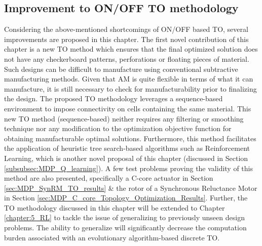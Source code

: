 \subsection{Improvement to ON/OFF TO methodology}

Considering the above-mentioned shortcomings of ON/OFF based TO, several improvements are proposed in this chapter. The first novel contribution of this chapter is a new TO method which ensures that the final optimized solution does not have any checkerboard patterns, perforations or floating pieces of material. Such designs can be difficult to manufacture using conventional subtractive manufacturing methods. Given that AM is quite flexible in terms of what it can manufacture, it is still necessary to check for manufacturability prior to finalizing the design. The proposed TO methodology leverages a sequence-based environment to impose connectivity on cells containing the same material. This new TO method (sequence-based) neither requires any filtering or smoothing technique nor any modification to the optimization objective function for obtaining manufacturable optimal solutions. Furthermore, this method facilitates the application of heuristic tree search-based algorithms such as Reinforcement Learning, which is another novel proposal of this chapter (discussed in Section \ref{subsubsec:MDP_Q_learning}). A few test problems proving the validity of this method are also presented, specifically a C-core actuator in Section \ref{sec:MDP_SynRM_TO_results} \& the rotor of a Synchronous Reluctance Motor in Section \ref{sec:MDP_C_core_Topology_Optimization_Results}. Further, the TO methodology discussed in this chapter will be extended to Chapter \ref{chapter:5_RL} to tackle the issue of generalizing to previously unseen design problems. The ability to generalize will significantly decrease the computation burden associated with an evolutionary algorithm-based discrete TO.

